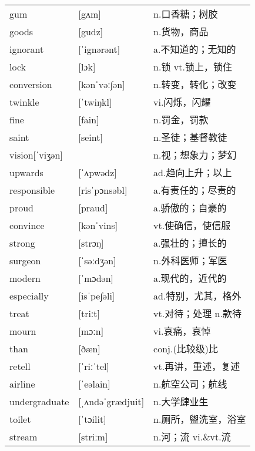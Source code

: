 \documentclass[a4paper]{article}
\begin{document}
\section{}
\begin{tabular}{l l l}

gum & [gʌm] & n.口香糖；树胶 \\
goods & [gudz] & n.货物，商品 \\
ignorant & [ˈignərənt] & a.不知道的；无知的 \\
lock & [lɔk] & n.锁 vt.锁上，锁住 \\
conversion & [kənˈvəː∫ən] & n.转变，转化；改变 \\
twinkle & [ˈtwiŋkl] & vi.闪烁，闪耀 \\
fine & [fain] & n.罚金，罚款 \\
saint & [seint] & n.圣徒；基督教徒 \\
vision[ˈviʒən] &  & n.视；想象力；梦幻 \\
upwards & [ˈʌpwədz] & ad.趋向上升；以上 \\
responsible & [risˈpɔnsəbl] & a.有责任的；尽责的 \\
proud & [praud] & a.骄傲的；自豪的 \\
convince & [kənˈvins] & vt.使确信，使信服 \\
strong & [strɔŋ] & a.强壮的；擅长的 \\
surgeon & [ˈsəːdʒən] & n.外科医师；军医 \\
modern & [ˈmɔdən] & a.现代的，近代的 \\
especially & [isˈpe∫əli] & ad.特别，尤其，格外 \\
treat & [triːt] & vt.对待；处理 n.款待 \\
mourn & [mɔːn] & vi.哀痛，哀悼 \\
than & [ðæn] & conj.(比较级)比 \\
retell & [ˈriːˈtel] & vt.再讲，重述，复述 \\
airline & [ˈeəlain] & n.航空公司；航线 \\
undergraduate & [ˌʌndəˈgrædjuit] & n.大学肆业生 \\
toilet & [ˈtɔilit] & n.厕所，盥洗室，浴室 \\
stream & [striːm] & n.河；流 vi.\&vt.流 \\

\end{tabular}
\end{document}
